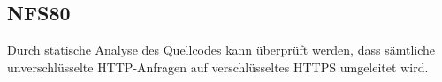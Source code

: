 \subsection*{NFS80}

Durch \gls{statische Analyse} des \Gls{Quellcode}s kann überprüft werden, dass sämtliche unverschlüsselte \Gls{HTTP}-Anfragen auf verschlüsseltes \Gls{HTTPS} umgeleitet wird.